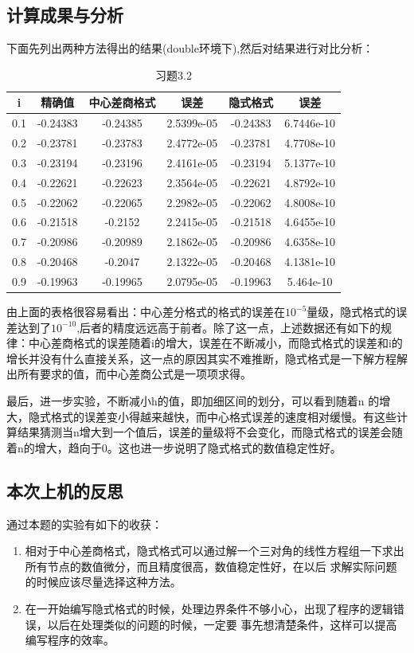 \documentclass{ctexart}
\begin{document}
\subsection {计算成果与分析}
下面先列出两种方法得出的结果(double环境下),然后对结果进行对比分析：
\begin{center}
\begin{longtable}{|c|c|cc|cc|}
\caption{习题3.2}\\
\hline
i& 精确值& 中心差商格式 & 误差& 隐式格式 & 误差 \\
\hline
0.1& -0.24383& -0.24385& 2.5399e-05& -0.24383& 6.7446e-10  \\
\hline
0.2& -0.23781& -0.23783& 2.4772e-05& -0.23781& 4.7708e-10 \\
\hline
0.3& -0.23194& -0.23196& 2.4161e-05& -0.23194& 5.1377e-10 \\
\hline
0.4& -0.22621& -0.22623& 2.3564e-05& -0.22621& 4.8792e-10 \\
\hline
0.5& -0.22062& -0.22065& 2.2982e-05& -0.22062& 4.8008e-10 \\
\hline
0.6& -0.21518& -0.2152& 2.2415e-05& -0.21518& 4.6455e-10 \\
\hline
0.7& -0.20986& -0.20989& 2.1862e-05& -0.20986& 4.6358e-10 \\
\hline
0.8& -0.20468& -0.2047& 2.1322e-05& -0.20468& 4.1381e-10 \\
\hline
0.9& -0.19963& -0.19965& 2.0795e-05& -0.19963& 5.464e-10\\
\hline 
\end{longtable}
\end{center}
由上面的表格很容易看出：中心差分格式的格式的误差在$10^{-5}$量级，隐式格式的误差达到了$10^{-10}$,后者的精度远远高于前者。除了这一点，上述数据还有如下的规律：中心差商格式的误差随着i的增大，误差在不断减小，而隐式格式的误差和i的增长并没有什么直接关系，这一点的原因其实不难推断，隐式格式是一下解方程解出所有要求的值，而中心差商公式是一项项求得。

最后，进一步实验，不断减小h的值，即加细区间的划分，可以看到随着n
的增大，隐式格式的误差变小得越来越快，而中心格式误差的速度相对缓慢。有这些计算结果猜测当n增大到一个值后，误差的量级将不会变化，而隐式格式的误差会随着n的增大，趋向于0。这也进一步说明了隐式格式的数值稳定性好。
\subsection{本次上机的反思}
通过本题的实验有如下的收获：
\begin{enumerate}
\item 
相对于中心差商格式，隐式格式可以通过解一个三对角的线性方程组一下求出所有节点的数值微分，而且精度很高，数值稳定性好，在以后
求解实际问题的时候应该尽量选择这种方法。
\item 
在一开始编写隐式格式的时候，处理边界条件不够小心，出现了程序的逻辑错误，以后在处理类似的问题的时候，一定要
事先想清楚条件，这样可以提高编写程序的效率。
\end{enumerate}
\end{document}
